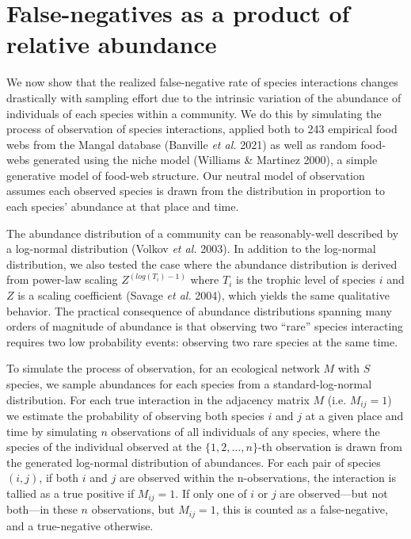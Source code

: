 \documentclass[11pt]{article}
\begin{document}
\hypertarget{false-negatives-as-a-product-of-relative-abundance}{%
\section{False-negatives as a product of relative
abundance}\label{false-negatives-as-a-product-of-relative-abundance}}

We now show that the realized false-negative rate of species
interactions changes drastically with sampling effort due to the
intrinsic variation of the abundance of individuals of each species
within a community. We do this by simulating the process of observation
of species interactions, applied both to 243 empirical food webs from
the Mangal database (Banville \emph{et al.} 2021) as well as random
food-webs generated using the niche model (Williams \& Martinez 2000), a
simple generative model of food-web structure. Our neutral model of
observation assumes each observed species is drawn from the distribution
in proportion to each species' abundance at that place and time.

The abundance distribution of a community can be reasonably-well
described by a log-normal distribution (Volkov \emph{et al.} 2003). In
addition to the log-normal distribution, we also tested the case where
the abundance distribution is derived from power-law scaling
\(Z^{(log(T_i)-1)}\) where \(T_i\) is the trophic level of species \(i\)
and \(Z\) is a scaling coefficient (Savage \emph{et al.} 2004), which
yields the same qualitative behavior. The practical consequence of
abundance distributions spanning many orders of magnitude of abundance
is that observing two ``rare'' species interacting requires two low
probability events: observing two rare species at the same time.

To simulate the process of observation, for an ecological network \(M\)
with \(S\) species, we sample abundances for each species from a
standard-log-normal distribution. For each true interaction in the
adjacency matrix \(M\) (i.e. \(M_{ij}=1\)) we estimate the probability
of observing both species \(i\) and \(j\) at a given place and time by
simulating \(n\) observations of all individuals of any species, where
the species of the individual observed at the \(\{1,2,\dots,n\}\)-th
observation is drawn from the generated log-normal distribution of
abundances. For each pair of species \((i,j)\), if both \(i\) and \(j\)
are observed within the n-observations, the interaction is tallied as a
true positive if \(M_{ij}=1\). If only one of \(i\) or \(j\) are
observed---but not both---in these \(n\) observations, but \(M_{ij}=1\),
this is counted as a false-negative, and a true-negative otherwise.
\end{document}

